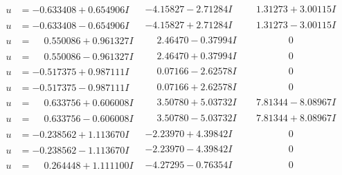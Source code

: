 \documentclass[1p]{elsarticle_modified}
\theoremstyle{definition}
\begin{document}
$$\begin{array}{c|c|c}
\begin{aligned}
u &= -0.633408 + 0.654906 I\end{aligned}
 & -4.15827 - 2.71284 I & \phantom{-}1.31273 + 3.00115 I \\ \hline\begin{aligned}
u &= -0.633408 - 0.654906 I\end{aligned}
 & -4.15827 + 2.71284 I & \phantom{-}1.31273 - 3.00115 I \\ \hline\begin{aligned}
u &= \phantom{-}0.550086 + 0.961327 I\end{aligned}
 & \phantom{-}2.46470 - 0.37994 I & \phantom{-0.000000 } 0 \\ \hline\begin{aligned}
u &= \phantom{-}0.550086 - 0.961327 I\end{aligned}
 & \phantom{-}2.46470 + 0.37994 I & \phantom{-0.000000 } 0 \\ \hline\begin{aligned}
u &= -0.517375 + 0.987111 I\end{aligned}
 & \phantom{-}0.07166 - 2.62578 I & \phantom{-0.000000 } 0 \\ \hline\begin{aligned}
u &= -0.517375 - 0.987111 I\end{aligned}
 & \phantom{-}0.07166 + 2.62578 I & \phantom{-0.000000 } 0 \\ \hline\begin{aligned}
u &= \phantom{-}0.633756 + 0.606008 I\end{aligned}
 & \phantom{-}3.50780 + 5.03732 I & \phantom{-}7.81344 - 8.08967 I \\ \hline\begin{aligned}
u &= \phantom{-}0.633756 - 0.606008 I\end{aligned}
 & \phantom{-}3.50780 - 5.03732 I & \phantom{-}7.81344 + 8.08967 I \\ \hline\begin{aligned}
u &= -0.238562 + 1.113670 I\end{aligned}
 & -2.23970 + 4.39842 I & \phantom{-0.000000 } 0 \\ \hline\begin{aligned}
u &= -0.238562 - 1.113670 I\end{aligned}
 & -2.23970 - 4.39842 I & \phantom{-0.000000 } 0 \\ \hline\begin{aligned}
u &= \phantom{-}0.264448 + 1.111100 I\end{aligned}
 & -4.27295 - 0.76354 I & \phantom{-0.000000 } 0 \\ \hline\begin{aligned}

\end{aligned}
\end{array}$$
\end{document}

